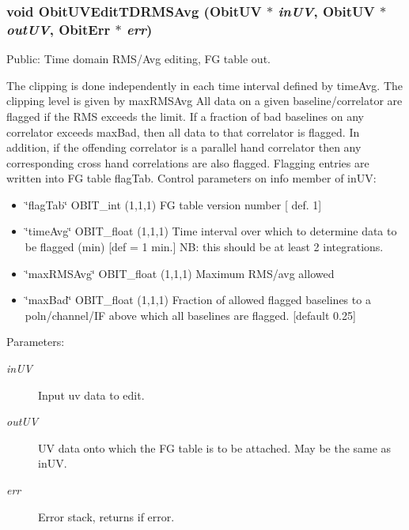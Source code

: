 \subsubsection{\setlength{\rightskip}{0pt plus 5cm}void Obit\-UVEdit\-TDRMSAvg ({\bf Obit\-UV} $\ast$ {\em in\-UV}, {\bf Obit\-UV} $\ast$ {\em out\-UV}, {\bf Obit\-Err} $\ast$ {\em err})}\label{ObitUVEdit_8c_a23}


Public: Time domain RMS/Avg editing, FG table out. 

The clipping is done independently in each time interval defined by time\-Avg. The clipping level is given by max\-RMSAvg All data on a given baseline/correlator are flagged if the RMS exceeds the limit. If a fraction of bad baselines on any correlator exceeds max\-Bad, then all data to that correlator is flagged. In addition, if the offending correlator is a parallel hand correlator then any corresponding cross hand correlations are also flagged. Flagging entries are written into FG table flag\-Tab. Control parameters on info member of in\-UV: \begin{itemize}
\item \char`\"{}flag\-Tab\char`\"{} OBIT\_\-int (1,1,1) FG table version number [ def. 1] \item \char`\"{}time\-Avg\char`\"{} OBIT\_\-float (1,1,1) Time interval over which to determine data to be flagged (min) [def = 1 min.] NB: this should be at least 2 integrations. \item \char`\"{}max\-RMSAvg\char`\"{} OBIT\_\-float (1,1,1) Maximum RMS/avg allowed \item \char`\"{}max\-Bad\char`\"{} OBIT\_\-float (1,1,1) Fraction of allowed flagged baselines to a poln/channel/IF above which all baselines are flagged. [default 0.25]\end{itemize}
\begin{Desc}
\item[Parameters:]
\begin{description}
\item[{\em in\-UV}]Input uv data to edit. \item[{\em out\-UV}]UV data onto which the FG table is to be attached. May be the same as in\-UV. \item[{\em err}]Error stack, returns if error. \end{description}
\end{Desc}
